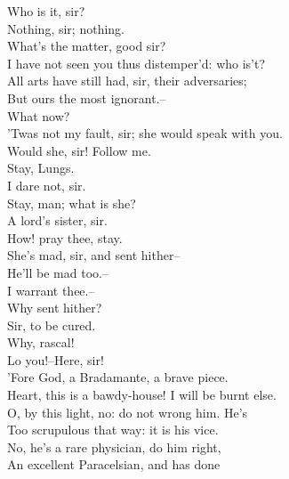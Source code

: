 \documentclass{memoir}
\begin{document}
\begin{drama*}
\mammonspeaks  Who is it, sir?\\
\subtlespeaks {} Nothing, sir; nothing.\\
\mammonspeaks {} What's the matter, good sir?\\
 I have not seen you thus distemper'd: who is't?\\
\subtlespeaks  All arts have still had, sir, their adversaries;\\
 But ours the most ignorant.--\\
 What now?\\
\facespeaks {} 'Twas not my fault, sir; she would speak with you.\\
\subtlespeaks  Would she, sir! Follow me.\\
\mammonspeaks {} Stay, Lungs.\\
\facespeaks {} I dare not, sir.\\
\mammonspeaks  Stay, man; what is she?\\
\facespeaks {} A lord's sister, sir.\\
\mammonspeaks  How! pray thee, stay.\\
\facespeaks {} She's mad, sir, and sent hither--\\
 He'll be mad too.--\\
\mammonspeaks {} I warrant thee.--\\
 Why sent hither?\\
\facespeaks {} Sir, to be cured.\\
\subtlespeaks {} Why, rascal!\\
\facespeaks {} Lo you!--Here, sir!\\
\mammonspeaks  'Fore God, a Bradamante, a brave piece.\\
\surlyspeaks  Heart, this is a bawdy-house! I will be burnt else.\\
\mammonspeaks  O, by this light, no: do not wrong him. He's\\
 Too scrupulous that way: it is his vice.\\
 No, he's a rare physician, do him right,\\
 An excellent Paracelsian, and has done\\

\end{drama*}
\end{document}
